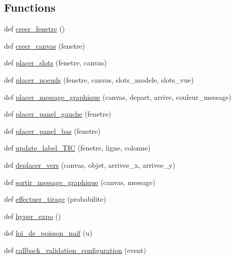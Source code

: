 \subsection*{Functions}
\begin{DoxyCompactItemize}
\item 
def \hyperlink{namespacesimulation__v2_a10832edd42c140de23ebbf784212e7da}{creer\+\_\+fenetre} ()
\item 
def \hyperlink{namespacesimulation__v2_a2bd09bd7465be64ee772a15cfae7bd18}{creer\+\_\+canvas} (fenetre)
\item 
def \hyperlink{namespacesimulation__v2_aabe5805e89887085519818a06d6b75d5}{placer\+\_\+slots} (fenetre, canvas)
\item 
def \hyperlink{namespacesimulation__v2_ae2a4e78dcc84c814791de7e5ecbc65c8}{placer\+\_\+noeuds} (fenetre, canvas, slots\+\_\+modele, slots\+\_\+vue)
\item 
def \hyperlink{namespacesimulation__v2_aeca478d149301caeff190b5a72fb9ec0}{placer\+\_\+message\+\_\+graphique} (canvas, depart, arrive, couleur\+\_\+message)
\item 
def \hyperlink{namespacesimulation__v2_ab28b46a677b9326de5438b2b352bc9e0}{placer\+\_\+panel\+\_\+gauche} (fenetre)
\item 
def \hyperlink{namespacesimulation__v2_a4068a1e97aea1a5222aecb62cc577ab2}{placer\+\_\+panel\+\_\+bas} (fenetre)
\item 
def \hyperlink{namespacesimulation__v2_a79b2ad503e8bcef0a56bb0c84c2e07f0}{update\+\_\+label\+\_\+\+T\+IC} (fenetre, ligne, colonne)
\item 
def \hyperlink{namespacesimulation__v2_aeb9126f5d35fd9eba71fd50110d3d0ab}{deplacer\+\_\+vers} (canvas, objet, arrivee\+\_\+x, arrivee\+\_\+y)
\item 
def \hyperlink{namespacesimulation__v2_aa0824a8248280be3f51f828fe9615ca9}{sortir\+\_\+message\+\_\+graphique} (canvas, message)
\item 
def \hyperlink{namespacesimulation__v2_acf49d37976869c0729e29284bd86c1d6}{effectuer\+\_\+tirage} (probabilite)
\item 
def \hyperlink{namespacesimulation__v2_af060f93fc787eec8e2322b5cc440f84c}{hyper\+\_\+expo} ()
\item 
def \hyperlink{namespacesimulation__v2_a9c232b56c2bd8fd84ad7a32b41ff00e3}{loi\+\_\+de\+\_\+poisson\+\_\+naif} (u)
\item 
def \hyperlink{namespacesimulation__v2_a80ced036d33d32401fef3d561562c030}{callback\+\_\+validation\+\_\+configuration} (event)
\item 

\end{DoxyCompactItemize}
